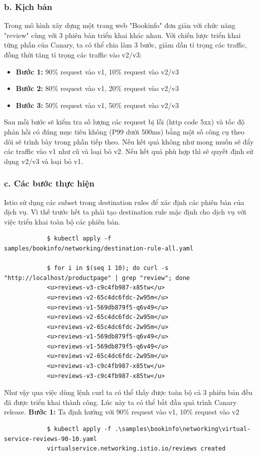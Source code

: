 \documentclass[12pt,a4paper]{report}
\begin{document}
{{		\subsubsection{b. Kịch bản}
		Trong mô hình xây dựng một trang web "Bookinfo" đơn giản với chức năng "review" cùng với 3 phiên bản triển khai khác nhau. Với chiến lược triển khai từng phần của Canary, ta có thể chia làm 3 bước, giảm dần tỉ trọng các traffic, đồng thời tăng tỉ trọng các traffic vào v2/v3:
		\begin{itemize}
			\item \textbf{Bước 1:} 90\% request vào v1, 10\% request vào v2/v3
			\item \textbf{Bước 2:} 80\% request vào v1, 20\% request vào v2/v3
			\item \textbf{Bước 3:} 50\% request vào v1, 50\% request vào v2/v3
		\end{itemize}
		Sau mỗi bước sẽ kiểm tra số lượng các request bị lỗi (http code 5xx) và tốc độ phản hồi có đúng mục tiêu không (P99 dưới 500ms) bằng một số công cụ theo dõi sẽ trình bày trong phần tiếp theo. Nếu kết quả không như mong muốn sẽ đẩy các traffic vào v1 như cũ và loại bỏ v2. Nếu kết quả phù hợp thì sẽ quyết định sử dụng v2/v3 và loại bỏ v1.
		\subsubsection{c. Các bước thực hiện}
		Istio sử dụng các subset trong destination rules để xác định các phiên bản của dịch vụ. Vì thế trước hết ta phải tạo destination rule mặc định cho dịch vụ với việc triển khai toàn bộ các phiên bản.
		\begin{lstlisting}
			$ kubectl apply -f samples/bookinfo/networking/destination-rule-all.yaml
			
			$ for i in $(seq 1 10); do curl -s "http://localhost/productpage" | grep "review"; done
			<u>reviews-v3-c9c4fb987-x85tw</u>
			<u>reviews-v2-65c4dc6fdc-2w95m</u>
			<u>reviews-v1-569db879f5-q6v49</u>
			<u>reviews-v2-65c4dc6fdc-2w95m</u>
			<u>reviews-v2-65c4dc6fdc-2w95m</u>
			<u>reviews-v1-569db879f5-q6v49</u>
			<u>reviews-v1-569db879f5-q6v49</u>
			<u>reviews-v2-65c4dc6fdc-2w95m</u>
			<u>reviews-v3-c9c4fb987-x85tw</u>
			<u>reviews-v3-c9c4fb987-x85tw</u>
		\end{lstlisting}
		Như vậy qua việc dùng lệnh {\color{red}curl} ta có thể thấy được toàn bộ cả 3 phiên bản đều đã được triển khai thành công.
		Lúc này ta có thể bắt đầu quá trình Canary release.
		\textbf{Bước 1:} Ta định hướng với 90\% request vào v1, 10\% request vào v2
		\begin{lstlisting}
			$ kubectl apply -f .\samples\bookinfo\networking\virtual-service-reviews-90-10.yaml
			virtualservice.networking.istio.io/reviews created
			

\end{lstlisting}}}
\end{document}
